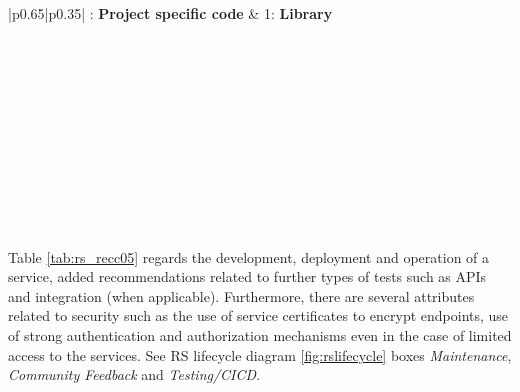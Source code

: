 \begin{center}
    \tabletail{\hline}
    \label{tab:rs_recc04}
    \small
    \begin{supertabular}{|p{0.65\linewidth}|p{0.35\linewidth}|} : \textbf{Project specific code} &
    1: \textbf{Library} \\ \hline \hline

     \\ \hline
     \\ \hline
     \\ \hline
     \\ \hline
     \\ \hline
     \\ \hline
     \\ \hline
     \\ \hline
     \\ \hline
     \\ \hline

\end{supertabular}
\end{center}

Table \ref{tab:rs_recc05} regards the development, deployment and operation of a service, added recommendations related to further types of tests such as APIs and integration (when applicable). Furthermore, there are several attributes related to security such as the use of service certificates to encrypt endpoints, use of strong authentication and authorization mechanisms even in the case of limited access to the services. See RS lifecycle diagram \ref{fig:rslifecycle} boxes \textit{Maintenance}, \textit{Community Feedback} and \textit{Testing/CICD}.

